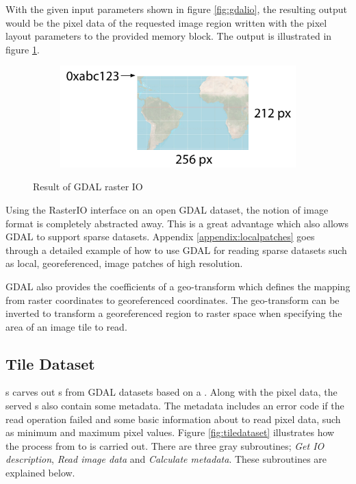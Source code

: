 With the given input parameters shown in figure \ref{fig:gdalio}, the resulting output would be the pixel data of the requested image region written with the pixel layout parameters to the provided memory block. The output is illustrated in figure \ref{fig:gdalioresult}.

\begin{figure}[htbp]
    \centering
    \begin{subfigure}[bt]{0.5\textwidth}
        \includegraphics[width=\textwidth]{figures/implementation/pipeline/gdalioresult.pdf}
    \end{subfigure}
    \caption{Result of GDAL raster IO}
    \label{fig:gdalioresult}
\end{figure}

Using the RasterIO interface on an open GDAL dataset, the notion of image format is completely abstracted away. This is a great advantage which also allows GDAL to support sparse datasets. Appendix \ref{appendix:localpatches} goes through a detailed example of how to use GDAL for reading sparse datasets such as local, georeferenced, image patches of high resolution.

GDAL also provides the coefficients of a geo-transform which defines the mapping from raster coordinates to georeferenced coordinates. The geo-transform can be inverted to transform a georeferenced region to raster space when specifying the area of an image tile to read.

\subsection{Tile Dataset}
s carves out s from GDAL datasets based on a . Along with the pixel data, the served s also contain some metadata. The metadata includes an error code if the read operation failed and some basic information about to read pixel data, such as minimum and maximum pixel values. Figure \ref{fig:tiledataset} illustrates how the process from  to  is carried out. There are three gray subroutines; \emph{Get IO description}, \emph{Read image data} and \emph{Calculate metadata}. These subroutines are explained below.

